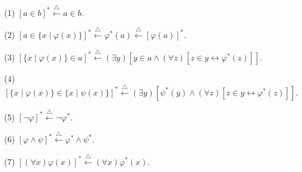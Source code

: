 (1) $[a \in b]^* \overset{\triangle}{\leftarrow} a \in b$.

(2) $[a \in \{x \mid \varphi(x)\}]^* \overset{\triangle}{\leftarrow} \varphi^*(a) \overset{\triangle}{\leftarrow} [\varphi(a)]^*$.

(3) $[\{x \mid \varphi(x)\} \in a]^* \overset{\triangle}{\leftarrow} (\exists y)[y \in a \land (\forall z)[z \in y \leftrightarrow \varphi^*(z)]]$.

(4) $[\{x \mid \varphi(x)\} \in \{x \mid \psi(x)\}]^* \overset{\triangle}{\leftarrow} (\exists y)[\psi^*(y) \land (\forall z)[z \in y \leftrightarrow \varphi^*(z)]]$.

(5) $[\neg \varphi]^* \overset{\triangle}{\leftarrow} \neg \varphi^*$.

(6) $[\varphi \land \psi]^* \overset{\triangle}{\leftarrow} \varphi^* \land \psi^*$.

(7) $[(\forall x) \varphi(x)]^* \overset{\triangle}{\leftarrow} (\forall x) \varphi^*(x)$.
